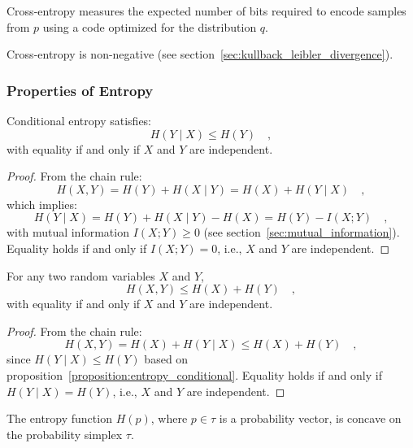 \documentclass[../../main.tex]{subfiles}
\begin{document}
\begin{remark}
    Cross-entropy measures the expected number of bits required to encode samples from \( p \) using a code optimized for the distribution \( q \).
\end{remark}

\begin{remark}
    Cross-entropy is non-negative (see section~\ref{sec:kullback_leibler_divergence}).
\end{remark}

\smallskip
\subsubsection{Properties of Entropy}

\begin{proposition}
    \label{proposition:entropy_conditional}
    Conditional entropy satisfies:
    \[
        H(Y \mid X) \leq H(Y) \quad ,
    \]
    with equality if and only if \( X \) and \( Y \) are independent.
\end{proposition}
\vspace{-2.5em}
\begin{proof}
    From the chain rule:
    \[
        H(X, Y) = H(Y) + H(X \mid Y) = H(X) + H(Y \mid X) \quad ,
    \]
    which implies:
    \[
        H(Y \mid X) = H(Y) + H(X \mid Y) - H(X) = H(Y) - I(X; Y) \quad ,
    \]
    with mutual information \( I(X; Y) \geq 0 \) (see section~\ref{sec:mutual_information}). Equality holds if and only if \( I(X; Y) = 0 \), i.e., \( X \) and \( Y \) are independent.
\end{proof}

\medskip
\begin{corollary}
    For any two random variables \( X \) and \( Y \),
    \[
        H(X, Y) \leq H(X) + H(Y) \quad ,
    \]
    with equality if and only if \( X \) and \( Y \) are independent.
\end{corollary}
\vspace{-2.5em}
\begin{proof}
    From the chain rule:
    \[
        H(X, Y) = H(X) + H(Y \mid X) \leq H(X) + H(Y) \quad ,
    \]
    since \( H(Y \mid X) \leq H(Y) \) based on proposition~\ref{proposition:entropy_conditional}. Equality holds if and only if \( H(Y \mid X) = H(Y) \), i.e., \( X \) and \( Y \) are independent.
\end{proof}

\medskip
\begin{theorem}
The entropy function \( H(p) \), where \( p \in \tau \) is a probability vector, is concave on the probability simplex $\tau$.
\end{theorem}
\end{document}
